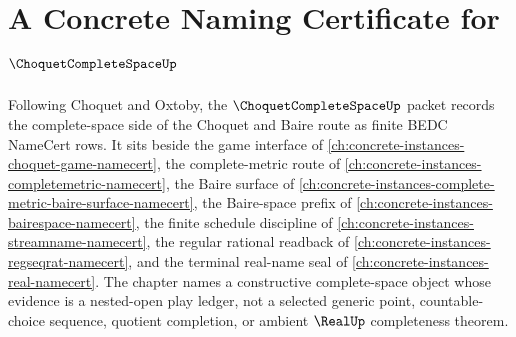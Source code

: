 \chapter{A Concrete Naming Certificate for $\ChoquetCompleteSpaceUp$}
\label{ch:concrete-instances-choquet-complete-space-namecert}

Following Choquet and Oxtoby, the $\ChoquetCompleteSpaceUp$ packet records the complete-space side of the Choquet and Baire route as finite BEDC NameCert rows. It sits beside the game interface of \autoref{ch:concrete-instances-choquet-game-namecert}, the complete-metric route of \autoref{ch:concrete-instances-completemetric-namecert}, the Baire surface of \autoref{ch:concrete-instances-complete-metric-baire-surface-namecert}, the Baire-space prefix of \autoref{ch:concrete-instances-bairespace-namecert}, the finite schedule discipline of \autoref{ch:concrete-instances-streamname-namecert}, the regular rational readback of \autoref{ch:concrete-instances-regseqrat-namecert}, and the terminal real-name seal of \autoref{ch:concrete-instances-real-namecert}. The chapter names a constructive complete-space object whose evidence is a nested-open play ledger, not a selected generic point, countable-choice sequence, quotient completion, or ambient $\RealUp$ completeness theorem.

